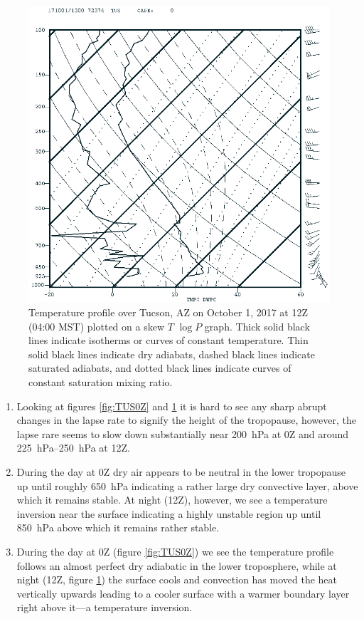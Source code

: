\documentclass[11pt]{article}
\begin{document}
\begin{figure}[h!]
  \centering
  \includegraphics[width=\textwidth]{TUSTempProfile12Z.png}
  \caption{Temperature profile over Tucson, AZ on October 1, 2017 at 12Z (04:00 MST) plotted on a skew $T$ $\log P$ graph. Thick solid black lines indicate isotherms or curves of constant temperature. Thin solid black lines indicate dry adiabats, dashed black lines indicate saturated adiabats, and dotted black lines indicate curves of constant saturation mixing ratio.}
  \label{fig:TUS12Z}
\end{figure}

\begin{enumerate}
  \item Looking at figures \ref{fig:TUS0Z} and \ref{fig:TUS12Z} it is hard to see any sharp abrupt changes in the lapse rate to signify the height of the tropopause, however, the lapse rare seems to slow down substantially near \SI{200}{\hecto\Pa} at 0Z and around \SIrange{225}{250}{\hecto\Pa} at 12Z.
  \item During the day at 0Z dry air appears to be neutral in the lower tropopause up until roughly \SI{650}{\hecto\Pa} indicating a rather large dry convective layer, above which it remains stable. At night (12Z), however, we see a temperature inversion near the surface indicating a highly unstable region up until \SI{850}{\hecto\Pa} above which it remains rather stable.
  \item During the day at 0Z (figure \ref{fig:TUS0Z}) we see the temperature profile follows an almost perfect dry adiabatic in the lower troposphere, while at night (12Z, figure \ref{fig:TUS12Z}) the surface cools and convection has moved the heat vertically upwards leading to a cooler surface with a warmer boundary layer right above it---a temperature inversion.
\end{enumerate}
\end{document}
